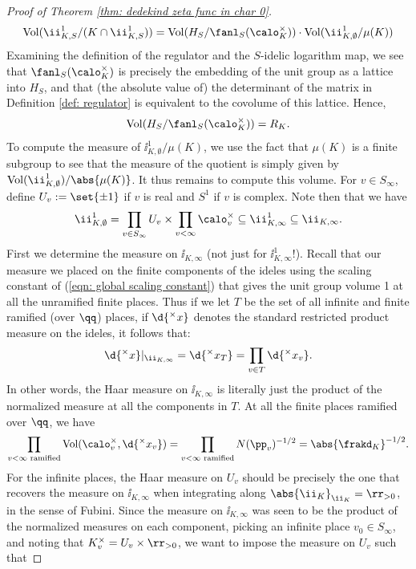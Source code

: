 \documentclass[11pt, x11names, openany]{book}
\begin{document}
\begin{proof}[Proof of Theorem \ref{thm: dedekind zeta func in char 0}]
\begin{equation*}
    \vol(\ii^1_{K, S}/(K \cap \ii^1_{K, S})) = \vol(H_S/\fanl_S(\calo_K^\times)) \cdot \vol(\ii^1_{K, \emptyset}/\mu(K))
\end{equation*}
Examining the definition of the regulator and the $S$-idelic logarithm map, we see that $\fanl_S(\calo_K^\times)$ is precisely the embedding of the unit group as a lattice into $H_S$, and that (the absolute value of) the determinant of the matrix in Definition \ref{def: regulator} is equivalent to the covolume of this lattice. Hence,
\begin{equation}
    \label{eqn: volume is regulator}
    \vol(H_S/\fanl_S(\calo_K^\times)) = R_K.
\end{equation}
To compute the measure of $\ii^1_{K, \emptyset}/ \mu(K)$, we use the fact that $\mu(K)$ is a finite subgroup to see that the measure of the quotient is simply given by $\vol(\ii^1_{K, \emptyset})/\abs{\mu(K)}$. It thus remains to compute this volume. For $v \in S_\infty$, define $U_v := \set{\pm 1}$ if $v$ is real and $S^1$ if $v$ is complex. Note then that we have
\begin{equation*}
    \ii^1_{K, \emptyset} = \prod_{v \in S_\infty} U_v \times \prod_{v < \infty} \calo_v^\times  \subseteq \ii^1_{K, \infty} \subseteq \ii_{K, \infty}.
\end{equation*}
First we determine the measure on $\ii_{K, \infty}$ (not just for $\ii^1_{K, \infty}$!). Recall that our measure we placed on the finite components of the ideles using the scaling constant of (\ref{eqn: global scaling constant}) that gives the unit group volume 1 at all the unramified finite places. Thus if we let $T$ be the set of all infinite and finite ramified (over $\qq$) places, if $\d{^\times x}$ denotes the standard restricted product measure on the ideles, it follows that:
\begin{equation*}
    \d{^\times x} \vert_{\ii_{K, \infty}}  = \d{^\times x_T} = \prod_{v \in T} \d{^\times x_v}.
\end{equation*}
In other words, the Haar measure on $\ii_{K, \infty}$ is literally just the product of the normalized measure at all the components in $T$.  At all the finite places ramified over $\qq$, we have
\begin{equation*}
    \prod_{v < \infty \text{ ramified}} \vol(\calo_v^\times, \d{^\times x_v}) = \prod_{v < \infty \text{ ramified}} N(\pp_v)^{-1/2} = \abs{\frakd_K}^{-1/2}.
\end{equation*} 
For the infinite places, the Haar measure on $U_v$ should be precisely the one that recovers the measure on $\ii_{K, \infty}$ when integrating along $\abs{\ii_K}_{\ii_K} = \rr_{> 0}$, in the sense of Fubini. Since the measure on $\ii_{K, \infty}$ was seen to be the product of the normalized measures on each component, picking an infinite place $v_0 \in S_\infty$, and noting that $K_v^\times = U_v \times \rr_{> 0}$, we want to impose the measure on $U_v$ such that

\end{proof}
\end{document}

